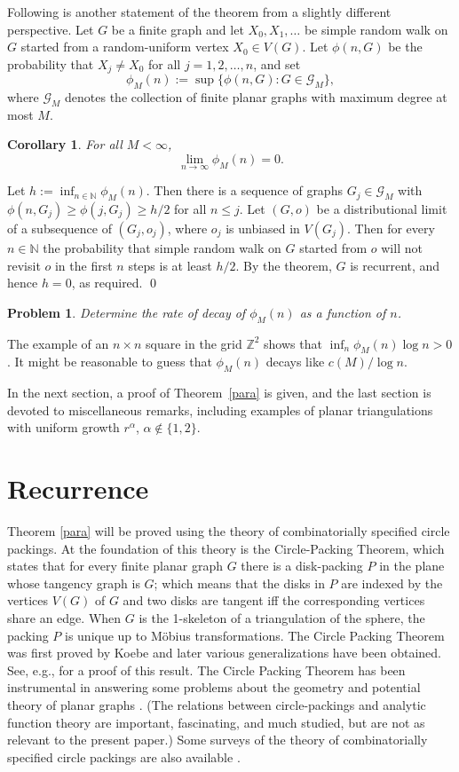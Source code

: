 \documentclass[12pt,naturalnames]{article}
\numberwithin{equation}{section}
\numberwithin{figure}{section}
\numberwithin{theorem}{section}
\newtheorem{corollary}[theorem]{Corollary}
\newtheorem{problem}[theorem]{Problem}
\newcommand{\Z}{\mathbb{Z}}
\newcommand{\N}{\mathbb{N}}
\def \proof {{ \medbreak \noindent {\bf Proof.} }}
\def\CdVcp{CdV91a}
\def\KoebeCP{pK36}
\begin{document}
Following is another statement of the theorem from a slightly
different perspective.  Let $G$ be a finite graph
and let $X_0,X_1,\dots$ be simple random walk
on $G$ started from  a random-uniform vertex $X_0\in V(G)$.
Let $\phi(n,G)$ be the probability that $X_j\ne X_0$
for all $j=1,2,\dots,n$, and set
$$
\phi_M(n):=\sup \bigl\{\phi(n,G) :G\in \mathcal{G}_M\bigr\},
$$
where $\mathcal{G}_M$ denotes the collection of finite
planar graphs with maximum degree at most $M$.

\begin{corollary} For all $M<\infty$,
$$
\lim_{n\to\infty} \phi_M(n)=0.
$$
\end{corollary}
\proof
Let $h:=\inf_{n\in\N} \phi_M(n)$.
Then there is a sequence
of graphs $G_j\in\mathcal{G}_M$ with $\phi(n,G_j)\ge \phi(j,G_j)\ge h/2$
for all $n\le j$.
Let $(G,o)$ be a distributional limit of a subsequence of
$(G_j,o_j)$, where $o_j$ is unbiased in $V(G_j)$.
Then for every $n\in\N$ the probability that simple
random walk on $G$
started from $o$ will not revisit $o$ in the first
$n$ steps is at least $h/2$.  By the theorem, $G$ is
recurrent, and hence $h=0$, as required.
\qed

\begin{problem}
Determine the rate of decay of $\phi_M(n)$ as a function of $n$.
\end{problem}

The example of an $n\times n$ square in the
grid $\Z^2$ shows that $\inf_n\phi_M(n)\log n>0$.
It might be reasonable to guess that $\phi_M(n)$ decays like $c(M)/\log n$.


\medskip

In the next section, a proof of Theorem~\ref{para} is given,
and the last section is devoted to miscellaneous remarks,
including examples of planar triangulations with
uniform growth $r^\alpha$, $\alpha\notin \{1,2\}$.

\section{Recurrence}

Theorem \ref{para} will be proved using the theory of combinatorially specified
circle packings.  At the foundation of this theory is
the Circle-Packing Theorem, which states
that for every finite planar graph $G$ there is
a disk-packing $P$ in the plane whose tangency graph is $G$;
which means that the disks in $P$ are indexed by the vertices
$V(G)$ of $G$ and two disks are tangent iff
the corresponding vertices share an edge.
When $G$ is the 1-skeleton of a triangulation of
the sphere, the packing $P$ is unique up to
M\"obius transformations.
The Circle Packing Theorem was first proved by Koebe
\cite{\KoebeCP} and later various generalizations
have been obtained.  See, e.g., \cite{\CdVcp}
for a proof of this result.
The Circle Packing Theorem
has been instrumental in answering some problems
about the geometry and potential theory of
planar graphs \cite{MP92b,MT90,BSc96,JS00}.
(The relations between circle-packings and analytic function theory
are important, fascinating, and much studied, but are
not as relevant to the present paper.)
Some surveys of the theory of combinatorially specified
circle packings are also available \cite{mB92,hSa94,kS99}. %
\end{document}
